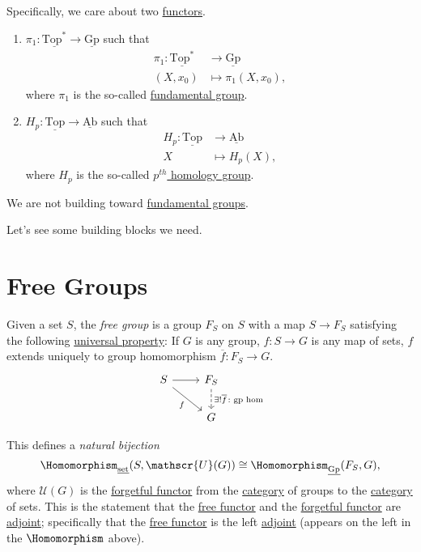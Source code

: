 \begin{remark}
	Specifically, we care about two \hyperref[def:functor]{functors}.
	\begin{enumerate}[(1)]
		\item \(\pi _1\colon \underline{\mathrm{Top}^*} \to \underline{\mathrm{Gp}}\) such that
		      \[
			      \begin{split}
				      \pi _1\colon \underline{\mathrm{Top}^*} &\to \underline{\mathrm{Gp}}\\
				      (X, x_0)&\mapsto \pi_1(X, x_0),
			      \end{split}
		      \]
		      where \(\pi _1\) is the so-called \hyperref[def:fundamental-group]{fundamental group}.
		\item \(H_p\colon \underline{\mathrm{Top}} \to \underline{\mathrm{Ab}}\) such that
		      \[
			      \begin{split}
				      H_p\colon \underline{\mathrm{Top}} &\to \underline{\mathrm{Ab}} \\
				      X&\mapsto H_{p} (X),
			      \end{split}
		      \]
		      where \(H_{p}\) is the so-called \hyperref[def:homology-group]{\(p^{th}\) homology group}.
	\end{enumerate}
	We are not building toward \hyperref[def:fundamental-group]{fundamental groups}.
\end{remark}

Let's see some building blocks we need.

\section{Free Groups}
\begin{definition}\label{def:free-group}
	Given a set \(S\), the \emph{free group} is a group \(F_S\) on \(S\) with a map \(S\to F_S\) satisfying the following
	\underline{universal property}: If \(G\) is any group, \(f\colon S\to G\) is any map of sets, \(f\) extends uniquely
	to group homomorphism \(\overline{f} \colon F_S \to G\).
	\[
		\begin{tikzcd}
			S \ar[rd, "f"']\ar[r, ] & F_S\ar[d, dashed, "\exists ! \overline{f} \colon \text{gp hom} "]\\
			& G
		\end{tikzcd}
	\]
\end{definition}
\begin{note}
	This defines a \emph{natural bijection}
	\[
		\Homomorphism_{\underline{\mathrm{set}}}(S, \mathscr{U}(G))\cong \Homomorphism_{\underline{\mathrm{Gp}}}(F_S, G),
	\]
	where \(\mathscr{U} (G)\) is the \hyperref[eg:forgetful-functor]{forgetful functor} from the
	\hyperref[def:category]{category} of groups to the \hyperref[def:category]{category} of sets. This is the
	statement that the \hyperref[eg:free-functor]{free functor} and the \hyperref[eg:forgetful-functor]{forgetful functor} are \hyperref[def:adjoint-functor]{adjoint};
	specifically that the \hyperref[eg:free-functor]{free functor} is the left \hyperref[def:adjoint-functor]{adjoint} (appears on the left in the \(\Homomorphism\) above).
\end{note}

